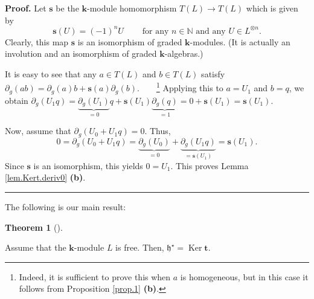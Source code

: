 \documentclass[numbers=enddot,12pt,final,onecolumn,notitlepage]{scrartcl}%
\theoremstyle{definition}
\newtheorem{theo}{Theorem}[section]
\newenvironment{theorem}[1][]
{\begin{theo}[#1]\begin{leftbar}}
{\end{leftbar}\end{theo}}
\newenvironment{proof}[1][Proof]{\noindent\textbf{#1.} }{\ \rule{0.5em}{0.5em}}
\begin{document}
\begin{proof}
Let $\mathbf{s}$ be the $\mathbf{k}$-module homomorphism $T\left(  L\right)
\to T\left(  L\right)  $ which is given by
\[
\mathbf{s}\left(  U\right)  = \left(  -1\right)  ^{n} U
\ \ \ \ \ \ \ \ \ \ \text{for any } n \in\mathbb{N} \text{ and any } U \in
L^{\otimes n} .
\]
Clearly, this map $\mathbf{s}$ is an isomorphism of graded $\mathbf{k}%
$-modules. (It is actually an involution and an isomorphism of graded
$\mathbf{k}$-algebras.)

It is easy to see that any $a\in T\left(  L\right)  $ and $b\in T\left(
L\right)  $ satisfy $\partial_{g}\left(  ab\right)  =\partial_{g}\left(
a\right)  b+\mathbf{s}\left(  a\right)  \partial_{g}\left(  b\right)
$.\ \ \ \ \footnote{Indeed, it is sufficient to prove this when $a$ is
homogeneous, but in this case it follows from Proposition \ref{prop.1}
\textbf{(b)}.} Applying this to $a=U_{1}$ and $b=q$, we obtain $\partial
_{g}\left(  U_{1}q\right)  =\underbrace{\partial_{g}\left(  U_{1}\right)
}_{=0}q+\mathbf{s}\left(  U_{1}\right)  \underbrace{\partial_{g}\left(
q\right)  }_{=1}=0+\mathbf{s}\left(  U_{1}\right)  =\mathbf{s}\left(
U_{1}\right)  $.

Now, assume that $\partial_{g}\left(  U_{0}+U_{1}q\right)  =0$. Thus,
\[
0=\partial_{g}\left(  U_{0}+U_{1}q\right)  =\underbrace{\partial_{g}\left(
U_{0}\right)  }_{=0}+\underbrace{\partial_{g}\left(  U_{1}q\right)
}_{=\mathbf{s}\left(  U_{1}\right)  }=\mathbf{s}\left(  U_{1}\right)  .
\]
Since $\mathbf{s}$ is an isomorphism, this yields $0=U_{1}$. This proves Lemma
\ref{lem.Kert.deriv0} \textbf{(b)}.
\end{proof}

The following is our main result:


\begin{theorem}
\label{thm.Kert}Assume that the $\mathbf{k}$-module $L$ is free. Then,
$\mathfrak{h}^{\star}=\operatorname*{Ker}\mathbf{t}$.
\end{theorem}
\end{document}
